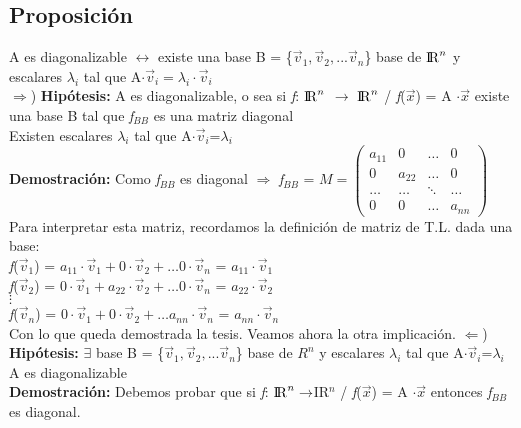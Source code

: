\documentclass[11pt]{article}
\begin{document}
\subsection{Proposición}
A es diagonalizable $\leftrightarrow$ existe una base B = \{$\vec{v}_{1}, \vec{v}_2,... \vec{v}_n $\} base de ${\rm I\!R}^{n}$ y escalares $\lambda_{i}$ tal que A$\cdot\vec{v}_{i}=\lambda_{i}\cdot\vec{v}_{i}$\\
$\Rightarrow$) {\bfseries {Hipótesis:}} A es diagonalizable, o sea si \textit{f}: ${\rm I\!R}^{n}$ $\rightarrow$ ${\rm I\!R}^{n}$ / \textit{f}($\vec{x}$) = A $\cdot \vec{x}$ existe una base B tal que \textbardbl \textit{f}\textbardbl $_{BB}$ \indent es una matriz diagonal\\
 Existen escalares $\lambda_{i}$ tal que A$\cdot\vec{v}_{i}$=$\lambda_{i}$ \\
\textbf{Demostración:} Como \textbardbl \textit{f}\textbardbl $_{BB}$ es diagonal $\Rightarrow$ \textbardbl \textit{f}\textbardbl $_{BB}$ = $M = \begin{pmatrix} a_{11}&0&\ldots&0\\ 0&a_{22}&\ldots&0\\ \ldots&\ldots&\ddots&\ldots\\ 0&0&\ldots&a_{nn} \end{pmatrix}$ \\
Para interpretar esta matriz, recordamos la definición de matriz de T.L. dada una base:\\
\textit{f}($\vec{v}_{1}$) = $a_{11}\cdot\vec{v}_1 + 0\cdot\vec{v}_2 + \ldots 0\cdot\vec{v}_{n}$ = $a_{11}\cdot\vec{v}_1$\\
\textit{f}($\vec{v}_{2}$) = $0\cdot\vec{v}_1 + a_{22}\cdot\vec{v}_2 + \ldots 0\cdot\vec{v}_{n}$ = $a_{22}\cdot\vec{v}_2$\\
$\vdots$\\
\textit{f}($\vec{v}_{n}$) = $0\cdot\vec{v}_1 + 0\cdot\vec{v}_2 + \ldots a_{nn}\cdot\vec{v}_{n}$ = $a_{nn}\cdot\vec{v}_n$ \\
Con lo que queda demostrada la tesis. Veamos ahora la otra implicación.
\newpage
\noindent $\Leftarrow$) {\bfseries {Hipótesis:}} $\exists$ base B = \{$\vec{v}_{1}, \vec{v}_2,... \vec{v}_n $\} base de $R^{n}$ y escalares $\lambda_{i}$ tal que A$\cdot\vec{v}_{i}$=$\lambda_{i}$\\
 A es diagonalizable \\
\textbf{Demostración:} Debemos probar que si \textit{f}: ${\rm I\!R}^{n}\rightarrow ${\rm I\!R}$^{n}$ / \textit{f}($\vec{x}$) = A $\cdot \vec{x}$ entonces \textbardbl \textit{f}\textbardbl $_{BB}$ es diagonal. \\
\end{document}
